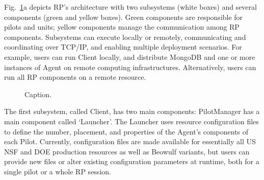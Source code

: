 \documentclass[preprint,12pt, a4paper]{elsarticle}
\begin{document}
Fig.~\ref{fig:archs}a depicts RP's architecture with two subsystems (white
boxes) and several components (green and yellow boxes). Green components are
responsible for pilots and units; yellow components manage the communication
among RP components. Subsystems can execute locally or remotely,
communicating and coordinating over TCP/IP\@, and enabling multiple
deployment scenarios. For example, users can run Client locally, and
distribute MongoDB and one or more instances of Agent on remote computing
infrastructures. Alternatively, users can run all RP components on a remote
resource.

\begin{figure}
    \centering
    \qquad
    \caption{Caption.}\label{fig:archs}
\end{figure}

The first subsystem, called Client, has two main components: PilotManager has
a main component called `Launcher'. The Launcher uses resource configuration
files to define the number, placement, and properties of the Agent's
components of each Pilot. Currently, configuration files are made available
for essentially all US NSF and DOE production resources as well as Beowulf
variants, but users can provide new files or alter existing configuration
parameters at runtime, both for a single pilot or a whole RP session.
\end{document}
